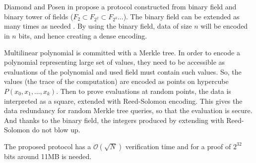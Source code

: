 Diamond and Posen in \cite{Binius} propose a protocol constructed from binary
field and binary tower of fields ($F_2 \subset F_{2^2} \subset F_{2^3}
\ldots$). The binary field can be extended as many 
times as needed \cite{Wiedemann86}. By using the binary field, data of size
$n$ will be encoded in $n$ bits, and hence creating a dense encoding.

Multilinear polynomial is committed with a Merkle tree. In order to
encode a polynomial representing large set of values, they need to be
accessible as evaluations of the polynomial and used field must contain such
values. So, the values (the trace of the computation) are encoded as points on
hypercube $P(x_0, x_1, \ldots, x_k)$. Then to prove evaluations at random
points, the data is interpreted as a square, extended with Reed-Solomon
encoding. This gives the data redundancy for random Merkle tree queries, so
that the evaluation is secure. And thanks to the binary field, the integers
produced by extending with Reed-Solomon do not blow up.

The proposed protocol has a $\mathcal{O}(\sqrt{N})$ verification time and
for a proof of $2^{32}$ bits around 11MB is needed.

